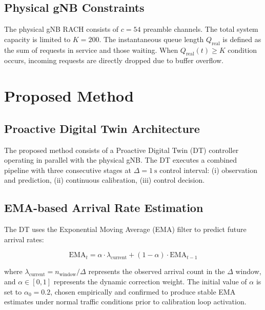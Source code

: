 \documentclass[conference]{IEEEtran}
\newcommand{\qreal}{Q_{\mathrm{real}}}
\newcommand{\ema}{\mathrm{EMA}}
\begin{document}
\subsection{Physical gNB Constraints}

The physical gNB RACH consists of $c = 54$ preamble channels. The total system capacity is limited to $K = 200$. The instantaneous queue length $\qreal$ is defined as the sum of requests in service and those waiting. When $\qreal(t) \geq K$ condition occurs, incoming requests are directly dropped due to buffer overflow.

\section{Proposed Method}

\subsection{Proactive Digital Twin Architecture}

The proposed method consists of a Proactive Digital Twin (DT) controller operating in parallel with the physical gNB. The DT executes a combined pipeline with three consecutive stages at $\Delta = 1\ \mathrm{s}$ control interval: (i) observation and prediction, (ii) continuous calibration, (iii) control decision.

\subsection{EMA-based Arrival Rate Estimation}

The DT uses the Exponential Moving Average (EMA) filter to predict future arrival rates:

\begin{equation}
\ema_t = \alpha \cdot \lambda_{\mathrm{current}} + (1 - \alpha) \cdot \ema_{t-1}
\label{eq:ema}
\end{equation}

\noindent where $\lambda_{\mathrm{current}} = n_{\mathrm{window}}/\Delta$ represents the observed arrival count in the $\Delta$ window, and $\alpha \in [0,1]$ represents the dynamic correction weight. The initial value of $\alpha$ is set to $\alpha_0 = 0.2$, chosen empirically and confirmed to produce stable EMA estimates under normal traffic conditions prior to calibration loop activation.
\end{document}
